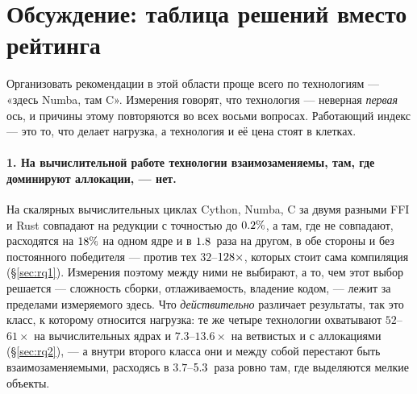 \section{Обсуждение: таблица решений вместо рейтинга}
\label{sec:discussion}

Организовать рекомендации в этой области проще всего по технологиям --- «здесь Numba, там C».
Измерения говорят, что технология --- неверная \emph{первая} ось, и причины этому
повторяются во всех восьми вопросах. Работающий индекс --- это то, что делает нагрузка, а
технология и её цена стоят в клетках.

\paragraph{1. На вычислительной работе технологии взаимозаменяемы, там, где доминируют
аллокации, --- нет.} На скалярных
вычислительных циклах Cython, Numba, C за двумя разными FFI и Rust совпадают на редукции с
точностью до $\meas{pct:b1_compute-314:arraysum/c_ctypes|b1_compute-314:arraysum/numba}{0.2}\%$, а там, где не совпадают, расходятся на $\meas{pct:b1_compute-314:mandelbrot/rust_ctypes|b1_compute-314:mandelbrot/cython}{18}\%$ на одном ядре и в $\meas{ratio:b1_compute-314:matmul/c_ctypes|b1_compute-314:matmul/numba}{1.8}$~раза на
другом, в обе стороны и без постоянного победителя --- против тех $32$--$\meas{ratio:b1_compute-314:matmul/cpython_loop|b1_compute-314:matmul/numba}{128}\times$, которых стоит
сама компиляция (\S\ref{sec:rq1}). Измерения поэтому между ними не выбирают, а то, чем этот выбор
решается --- сложность сборки, отлаживаемость, владение кодом, --- лежит за пределами
измеряемого здесь. Что \emph{действительно} различает
результаты, так это класс, к которому относится нагрузка: те же четыре технологии охватывают
$52$--$61\times$ на вычислительных ядрах и $7.3$--$13.6\times$ на ветвистых и с аллокациями
(\S\ref{sec:rq2}), --- а внутри второго класса они и между собой перестают быть
взаимозаменяемыми, расходясь в $3.7$--$\meas{ratio:b2_branchy-314:binarytrees/numba|b2_branchy-314:binarytrees/rust_ctypes}{5.3}$~раза ровно там, где выделяются мелкие объекты.

